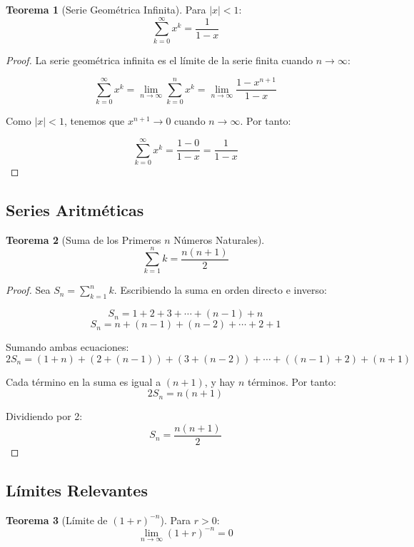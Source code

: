 \documentclass[12pt,a4paper]{article}
\theoremstyle{definition}
\newtheorem{teorema}{Teorema}[section]
\begin{document}
\begin{teorema}[Serie Geométrica Infinita]
Para $|x| < 1$:
\begin{equation}
\sum_{k=0}^{\infty} x^k = \frac{1}{1 - x}
\end{equation}
\end{teorema}

\begin{proof}
La serie geométrica infinita es el límite de la serie finita cuando $n \to \infty$:

$$\sum_{k=0}^{\infty} x^k = \lim_{n \to \infty} \sum_{k=0}^{n} x^k = \lim_{n \to \infty} \frac{1 - x^{n+1}}{1 - x}$$

Como $|x| < 1$, tenemos que $x^{n+1} \to 0$ cuando $n \to \infty$. Por tanto:

$$\sum_{k=0}^{\infty} x^k = \frac{1 - 0}{1 - x} = \frac{1}{1 - x}$$
\end{proof}

\subsection{Series Aritméticas}

\begin{teorema}[Suma de los Primeros $n$ Números Naturales]
\begin{equation}
\sum_{k=1}^{n} k = \frac{n(n+1)}{2}
\end{equation}
\end{teorema}

\begin{proof}
Sea $S_n = \sum_{k=1}^{n} k$. Escribiendo la suma en orden directo e inverso:

$$S_n = 1 + 2 + 3 + \cdots + (n-1) + n$$
$$S_n = n + (n-1) + (n-2) + \cdots + 2 + 1$$

Sumando ambas ecuaciones:
$$2S_n = (1+n) + (2+(n-1)) + (3+(n-2)) + \cdots + ((n-1)+2) + (n+1)$$

Cada término en la suma es igual a $(n+1)$, y hay $n$ términos. Por tanto:
$$2S_n = n(n+1)$$

Dividiendo por 2:
$$S_n = \frac{n(n+1)}{2}$$
\end{proof}

\subsection{Límites Relevantes}

\begin{teorema}[Límite de $(1 + r)^{-n}$]
Para $r > 0$:
\begin{equation}
\lim_{n \to \infty} (1 + r)^{-n} = 0
\end{equation}
\end{teorema}
\end{document}
